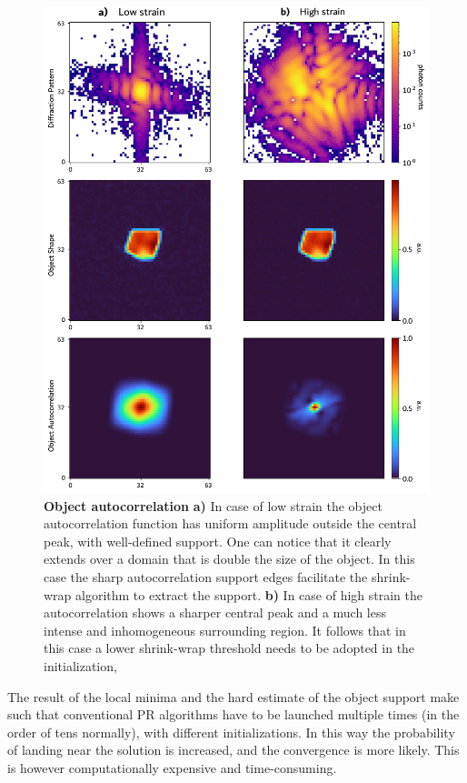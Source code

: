 \begin{figure}[H]
    \centering
    \includegraphics[width=\textwidth]{figures/Intro/autocorr.pdf}
    \caption{\textbf{Object autocorrelation} \textbf{a)} In case of low strain the object autocorrelation function has 
    uniform amplitude outside the central peak, with well-defined support. One can notice that it clearly extends over a domain 
    that is double the size of the object. 
    In this case the sharp autocorrelation support edges facilitate the shrink-wrap algorithm to extract the support. \textbf{b)} In case of high 
    strain the autocorrelation shows a sharper central peak and a much less intense and inhomogeneous surrounding region. 
    It follows that in this case a lower shrink-wrap threshold needs to be adopted in the initialization, }
    \label{fig:autocorr}
\end{figure}

The result of the local minima and the hard estimate of the object support make such that conventional PR algorithms
have to be launched multiple times (in the order of tens normally), with different initializations. In this way the probability 
of landing near the solution is increased, and the convergence is more likely. This is however computationally expensive 
and time-consuming. 

